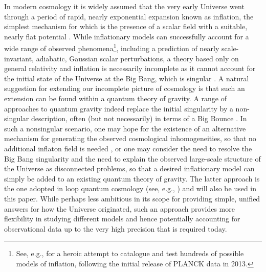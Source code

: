 \documentclass[aps,prd,11pt,showkeys,nofootinbib]{revtex4-2}
\begin{document}
In modern cosmology it is widely assumed that the very early Universe went through a period of rapid, nearly exponential expansion known as inflation, the simplest mechanism for which is the presence of a scalar field with a suitable, nearly flat potential \cite{Baumann_2022}. While inflationary models can successfully account for a wide range of observed phenomena\footnote{See, e.g., \cite{Martin:2013tda} for a heroic attempt to catalogue and test hundreds of possible models of inflation, following the initial release of PLANCK data in 2013.}, including a prediction of nearly scale-invariant, adiabatic, Gaussian scalar perturbations, a theory based only on general relativity and inflation is necessarily incomplete as it cannot account for the initial state of the Universe at the Big Bang, which is singular \cite{Borde:2001nh}. A natural suggestion for extending our incomplete picture of cosmology is that such an extension can be found within a quantum theory of gravity. A range of approaches to quantum gravity indeed replace the initial singularity by a non-singular description, often (but not necessarily) in terms of a Big Bounce \cite{Ashtekar:2011ni,Oriti:2016qtz,Brahma:2021tkh}. In such a nonsingular scenario, one may hope for the existence of an alternative mechanism for generating the observed cosmological inhomogeneities, so that no additional inflaton field is needed \cite{Khoury:2001wf,Brandenberger:2016vhg,Marchetti:2025jze}, or one may consider the need to resolve the Big Bang singularity and the need to explain the observed large-scale structure of the Universe as disconnected problems, so that a desired inflationary model can simply be added to an existing quantum theory of gravity. The latter approach is the one adopted in loop quantum cosmology (see, e.g., \cite{Bojowald:2011iq}) and will also be used in this paper. While perhaps less ambitious in its scope for providing simple, unified answers for how the Universe originated, such an approach provides more flexibility in studying different models and hence potentially accounting for observational data up to the very high precision that is required today. 
\end{document}
